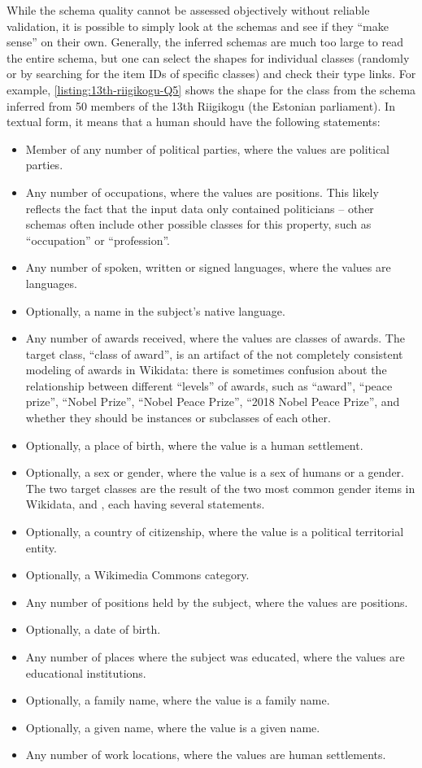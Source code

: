 While the \gls{schema} quality cannot be assessed objectively without reliable validation,
it is possible to simply look at the \glspl{schema} and see if they “make sense” on their own.
Generally, the inferred \glspl{schema} are much too large to read the entire \gls{schema},
but one can select the \glspl{shape} for individual classes
(randomly or by searching for the \glspl{item ID} of specific classes)
and check their \glspl{type link}.
For example, \cref{listing:13th-riigikogu-Q5} shows the \gls{shape} for the class 
from the \gls{schema} inferred from 50 members of the 13th Riigikogu (the Estonian parliament).
In textual form, it means that a human should have the following \glspl{statement}:
\begin{itemize}
\item Member of any number of political parties, where the values are political parties.
\item Any number of occupations, where the values are positions.
  This likely reflects the fact that the input data only contained politicians –
  other \glspl{schema} often include other possible classes for this property,
  such as “occupation” or “profession”.
\item Any number of spoken, written or signed languages, where the values are languages.
\item Optionally, a name in the subject’s native language.
\item Any number of awards received, where the values are classes of awards.
  The target class, “class of award”, is an artifact of the not completely consistent modeling of awards in \gls{Wikidata}:
  there is sometimes confusion about the relationship between different “levels” of awards,
  such as “award”, “peace prize”, “Nobel Prize”, “Nobel Peace Prize”, “2018 Nobel Peace Prize”,
  and whether they should be instances or subclasses of each other.
\item Optionally, a place of birth, where the value is a human settlement.
\item Optionally, a sex or gender, where the value is a sex of humans or a gender.
  The two target classes are the result of the two most common gender \glspl{item} in \gls{Wikidata},
   and ,
  each having several  statements.
\item Optionally, a country of citizenship, where the value is a political territorial entity.
\item Optionally, a \gls{Wikimedia Commons} category.
\item Any number of positions held by the subject, where the values are positions.
\item Optionally, a date of birth.
\item Any number of places where the subject was educated, where the values are educational institutions.
\item Optionally, a family name, where the value is a family name.
\item Optionally, a given name, where the value is a given name.
\item Any number of work locations, where the values are human settlements.
\end{itemize}

